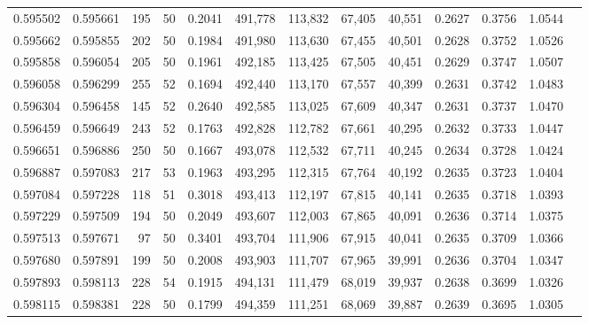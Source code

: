 \begin{tabular}{rrrrrrrrrrrrr}
0.595502 & 0.595661 &   195 &  50 &                                     0.2041 & 491,778 & 113,832 &  67,405 &  40,551 & 0.2627 & 0.3756 & 1.0544 \\
0.595662 & 0.595855 &   202 &  50 &                                     0.1984 & 491,980 & 113,630 &  67,455 &  40,501 & 0.2628 & 0.3752 & 1.0526 \\
0.595858 & 0.596054 &   205 &  50 &                                     0.1961 & 492,185 & 113,425 &  67,505 &  40,451 & 0.2629 & 0.3747 & 1.0507 \\
0.596058 & 0.596299 &   255 &  52 &                                     0.1694 & 492,440 & 113,170 &  67,557 &  40,399 & 0.2631 & 0.3742 & 1.0483 \\
0.596304 & 0.596458 &   145 &  52 &                                     0.2640 & 492,585 & 113,025 &  67,609 &  40,347 & 0.2631 & 0.3737 & 1.0470 \\
0.596459 & 0.596649 &   243 &  52 &                                     0.1763 & 492,828 & 112,782 &  67,661 &  40,295 & 0.2632 & 0.3733 & 1.0447 \\
0.596651 & 0.596886 &   250 &  50 &                                     0.1667 & 493,078 & 112,532 &  67,711 &  40,245 & 0.2634 & 0.3728 & 1.0424 \\
0.596887 & 0.597083 &   217 &  53 &                                     0.1963 & 493,295 & 112,315 &  67,764 &  40,192 & 0.2635 & 0.3723 & 1.0404 \\
0.597084 & 0.597228 &   118 &  51 &                                     0.3018 & 493,413 & 112,197 &  67,815 &  40,141 & 0.2635 & 0.3718 & 1.0393 \\
0.597229 & 0.597509 &   194 &  50 &                                     0.2049 & 493,607 & 112,003 &  67,865 &  40,091 & 0.2636 & 0.3714 & 1.0375 \\
0.597513 & 0.597671 &    97 &  50 &                                     0.3401 & 493,704 & 111,906 &  67,915 &  40,041 & 0.2635 & 0.3709 & 1.0366 \\
0.597680 & 0.597891 &   199 &  50 &                                     0.2008 & 493,903 & 111,707 &  67,965 &  39,991 & 0.2636 & 0.3704 & 1.0347 \\
0.597893 & 0.598113 &   228 &  54 &                                     0.1915 & 494,131 & 111,479 &  68,019 &  39,937 & 0.2638 & 0.3699 & 1.0326 \\
0.598115 & 0.598381 &   228 &  50 &                                     0.1799 & 494,359 & 111,251 &  68,069 &  39,887 & 0.2639 & 0.3695 & 1.0305 \\

\end{tabular}
